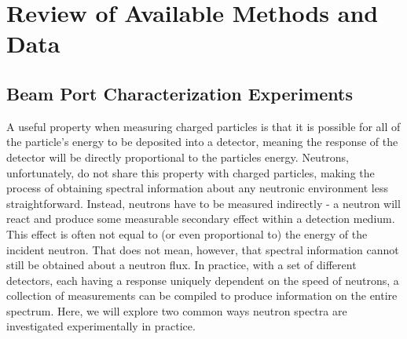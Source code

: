 \cleardoublepage

\chapter{Review of Available Methods and Data}


\section{Beam Port Characterization Experiments}

A useful property when measuring charged particles is that it is possible for all of the particle's energy to be deposited into a detector, meaning the response of the detector will be directly proportional to the particles energy.
Neutrons, unfortunately, do not share this property with charged particles, making the process of obtaining spectral information about any neutronic environment less straightforward.
Instead, neutrons have to be measured indirectly - a neutron will react and produce some measurable secondary effect within a detection medium.
This effect is often not equal to (or even proportional to) the energy of the incident neutron.
That does not mean, however, that spectral information cannot still be obtained about a neutron flux.
In practice, with a set of different detectors, each having a response uniquely dependent on the speed of neutrons, a collection of measurements can be compiled to produce information on the entire spectrum.
Here, we will explore two common ways neutron spectra are investigated experimentally in practice.

